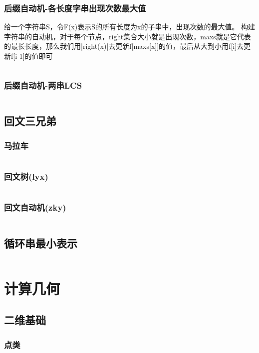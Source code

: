 \documentclass[a4paper]{article}
\newcommand{\cppcode}[1]{
    \inputminted[mathescape,
    frame=lines,linenos]{cpp}{source/#1}
}
\begin{document}
\subsubsection{后缀自动机-各长度字串出现次数最大值}
\indent 给一个字符串S，令F(x)表示S的所有长度为x的子串中，出现次数的最大值。
\indent 构建字符串的自动机，对于每个节点，right集合大小就是出现次数，maxs就是它代表的最长长度，那么我们用|right(x)|去更新f[maxs[x]]的值，最后从大到小用f[i]去更新f[i-1]的值即可

\cppcode{string-manipulation/Sam-max.cpp}
\subsubsection{后缀自动机-两串LCS}
\cppcode{string-manipulation/Sam-2LCS.cpp}

\subsection{回文三兄弟}
\subsubsection{马拉车}
\cppcode{string-manipulation/Manacher.cpp}
\subsubsection{回文树(lyx)}
\cppcode{string-manipulation/PAMM.cpp}
\subsubsection{回文自动机(zky)}
\cppcode{string-manipulation/PAM.cpp}




\subsection{循环串最小表示}
\cppcode{string-manipulation/minexpress.cpp}

\section{计算几何}

\subsection{二维基础}

\subsubsection{点类}
\end{document}
